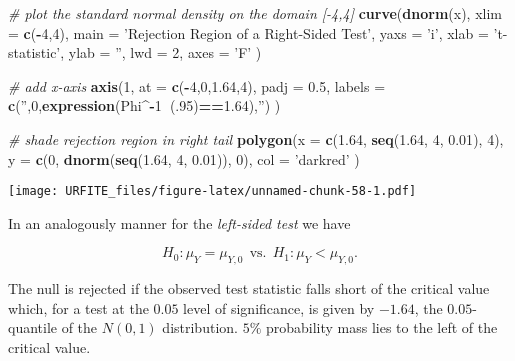 \documentclass[]{book}
\newenvironment{Shaded}{\begin{snugshade}}{\end{snugshade}}
\newcommand{\KeywordTok}[1]{\textcolor[rgb]{0.13,0.29,0.53}{\textbf{#1}}}
\newcommand{\DataTypeTok}[1]{\textcolor[rgb]{0.13,0.29,0.53}{#1}}
\newcommand{\DecValTok}[1]{\textcolor[rgb]{0.00,0.00,0.81}{#1}}
\newcommand{\FloatTok}[1]{\textcolor[rgb]{0.00,0.00,0.81}{#1}}
\newcommand{\StringTok}[1]{\textcolor[rgb]{0.31,0.60,0.02}{#1}}
\newcommand{\CommentTok}[1]{\textcolor[rgb]{0.56,0.35,0.01}{\textit{#1}}}
\newcommand{\OperatorTok}[1]{\textcolor[rgb]{0.81,0.36,0.00}{\textbf{#1}}}
\newcommand{\NormalTok}[1]{#1}
\theoremstyle{definition}
\theoremstyle{definition}
\theoremstyle{definition}
\theoremstyle{remark}
\begin{document}
\begin{Shaded}
\begin{Highlighting}[]
\CommentTok{# plot the standard normal density on the domain [-4,4]}
\KeywordTok{curve}\NormalTok{(}\KeywordTok{dnorm}\NormalTok{(x),}
      \DataTypeTok{xlim =} \KeywordTok{c}\NormalTok{(}\OperatorTok{-}\DecValTok{4}\NormalTok{,}\DecValTok{4}\NormalTok{),}
      \DataTypeTok{main =} \StringTok{'Rejection Region of a Right-Sided Test'}\NormalTok{,}
      \DataTypeTok{yaxs =} \StringTok{'i'}\NormalTok{,}
      \DataTypeTok{xlab =} \StringTok{'t-statistic'}\NormalTok{,}
      \DataTypeTok{ylab =} \StringTok{''}\NormalTok{,}
      \DataTypeTok{lwd =} \DecValTok{2}\NormalTok{,}
      \DataTypeTok{axes =} \StringTok{'F'}
\NormalTok{)}

\CommentTok{# add x-axis}
\KeywordTok{axis}\NormalTok{(}\DecValTok{1}\NormalTok{, }
     \DataTypeTok{at =} \KeywordTok{c}\NormalTok{(}\OperatorTok{-}\DecValTok{4}\NormalTok{,}\DecValTok{0}\NormalTok{,}\FloatTok{1.64}\NormalTok{,}\DecValTok{4}\NormalTok{), }
     \DataTypeTok{padj =} \FloatTok{0.5}\NormalTok{,}
     \DataTypeTok{labels =} \KeywordTok{c}\NormalTok{(}\StringTok{''}\NormalTok{,}\DecValTok{0}\NormalTok{,}\KeywordTok{expression}\NormalTok{(Phi}\OperatorTok{^-}\DecValTok{1}\OperatorTok{~}\NormalTok{(.}\DecValTok{95}\NormalTok{)}\OperatorTok{==}\FloatTok{1.64}\NormalTok{),}\StringTok{''}\NormalTok{)}
\NormalTok{)}

\CommentTok{# shade rejection region in right tail}
\KeywordTok{polygon}\NormalTok{(}\DataTypeTok{x =} \KeywordTok{c}\NormalTok{(}\FloatTok{1.64}\NormalTok{, }\KeywordTok{seq}\NormalTok{(}\FloatTok{1.64}\NormalTok{, }\DecValTok{4}\NormalTok{, }\FloatTok{0.01}\NormalTok{), }\DecValTok{4}\NormalTok{),}
        \DataTypeTok{y =} \KeywordTok{c}\NormalTok{(}\DecValTok{0}\NormalTok{, }\KeywordTok{dnorm}\NormalTok{(}\KeywordTok{seq}\NormalTok{(}\FloatTok{1.64}\NormalTok{, }\DecValTok{4}\NormalTok{, }\FloatTok{0.01}\NormalTok{)), }\DecValTok{0}\NormalTok{), }
        \DataTypeTok{col =} \StringTok{'darkred'}
\NormalTok{)}
\end{Highlighting}
\end{Shaded}

\texttt{[image: URFITE\_files/figure-latex/unnamed-chunk-58-1.pdf]}

In an analogously manner for the \emph{left-sided test} we have

\[ H_0: \mu_Y = \mu_{Y,0} \ \ \text{vs.} \ \ H_1: \mu_Y < \mu_{Y,0}. \]

The null is rejected if the observed test statistic falls short of the
critical value which, for a test at the \(0.05\) level of significance,
is given by \(-1.64\), the \(0.05\)-quantile of the \(N(0,1)\)
distribution. \(5\%\) probability mass lies to the left of the critical
value.
\end{document}
